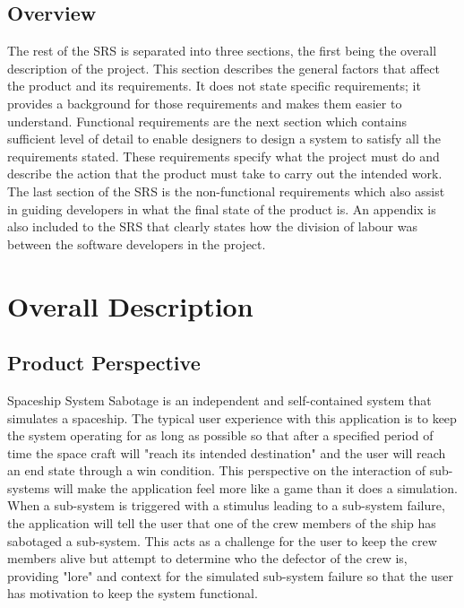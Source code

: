 \documentclass[12pt, titlepage]{article}
\newcommand\tab[1][1cm]{\hspace*{#1}}
\begin{document}
\subsection{Overview}
\label{sub:overview}
\tab The rest of the SRS is separated into three sections, the first being the overall description of the project. This section describes the general factors that affect the product and its requirements. It does not state specific requirements; it provides a background for those requirements and makes them easier to understand. Functional requirements are the next section which contains sufficient level of detail to enable designers to design a system to satisfy all the requirements stated. These requirements specify what the project must do and describe the action that the product must take to carry out the intended work. The last section of the SRS is the non-functional requirements which also assist in guiding developers in what the final state of the product is. An appendix is also included to the SRS that clearly states how the division of labour was between the software developers in the project.


\section{Overall Description}
\subsection{Product Perspective}
\tab Spaceship System Sabotage is an independent and self-contained system that simulates a spaceship. The typical user experience with this application is to keep the system operating for as long as possible so that after a specified period of time the space craft will "reach its intended destination" and the user will reach an end state through a win condition. This perspective on the interaction of sub-systems will make the application feel more like a game than it does a simulation. When a sub-system is triggered with a stimulus leading to a sub-system failure, the application will tell the user that one of the crew members of the ship has sabotaged a sub-system. This acts as a challenge for the user to keep the crew members alive but attempt to determine who the defector of the crew is, providing "lore" and context for the simulated sub-system failure so that the user has motivation to keep the system functional.
\end{document}

